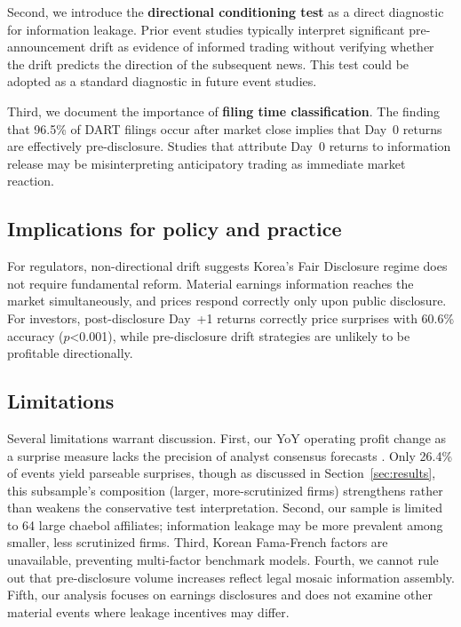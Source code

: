 \documentclass[review,authoryear]{elsarticle}
\begin{document}
Second, we introduce the \textbf{directional conditioning test} as a direct diagnostic for information leakage. Prior event studies typically interpret significant pre-announcement drift as evidence of informed trading without verifying whether the drift predicts the direction of the subsequent news. This test could be adopted as a standard diagnostic in future event studies.

Third, we document the importance of \textbf{filing time classification}. The finding that 96.5\% of DART filings occur after market close implies that Day~0 returns are effectively pre-disclosure. Studies that attribute Day~0 returns to information release may be misinterpreting anticipatory trading as immediate market reaction.

\subsection{Implications for policy and practice}

For regulators, non-directional drift suggests Korea's Fair Disclosure regime does not require fundamental reform. Material earnings information reaches the market simultaneously, and prices respond correctly only upon public disclosure. For investors, post-disclosure Day~+1 returns correctly price surprises with 60.6\% accuracy ($p$<0.001), while pre-disclosure drift strategies are unlikely to be profitable directionally.

\subsection{Limitations}

Several limitations warrant discussion. First, our YoY operating profit change as a surprise measure lacks the precision of analyst consensus forecasts \citep{livnat2006comparing}. Only 26.4\% of events yield parseable surprises, though as discussed in Section~\ref{sec:results}, this subsample's composition (larger, more-scrutinized firms) strengthens rather than weakens the conservative test interpretation. Second, our sample is limited to 64 large chaebol affiliates; information leakage may be more prevalent among smaller, less scrutinized firms. Third, Korean Fama-French factors are unavailable, preventing multi-factor benchmark models. Fourth, we cannot rule out that pre-disclosure volume increases reflect legal mosaic information assembly. Fifth, our analysis focuses on earnings disclosures and does not examine other material events where leakage incentives may differ.
\end{document}
